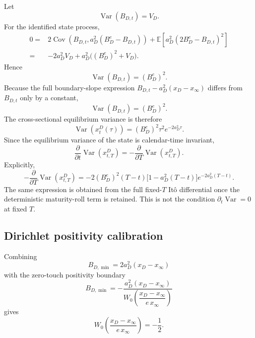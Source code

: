 \documentclass[12pt]{article}
\numberwithin{equation}{subsection}
\newcommand{\E}{\mathbb{E}}
\newcommand{\Var}{\operatorname{Var}}
\newcommand{\Cov}{\operatorname{Cov}}
\begin{document}
Let
\begin{equation}
\Var(B_{D,t})=V_D.
\end{equation}
For the identified state process,
\begin{equation}
\begin{aligned}
0
={}&
2\Cov\!\left(B_{D,t},a_D^2(B_D^e-B_{D,t})\right)
+
\E\!\left[a_D^2(2B_D^e-B_{D,t})^2\right]
\\
={}&
-2a_D^2V_D+a_D^2\bigl((B_D^e)^2+V_D\bigr).
\end{aligned}
\end{equation}
Hence
\begin{equation}
\Var(B_{D,t})=(B_D^e)^2.
\end{equation}
Because the full boundary-slope expression $B_{D,t}-a_D^2(x_D-x_\infty)$ differs from $B_{D,t}$ only by a constant,
\begin{equation}
\Var(B_{D,t})=(B_D^e)^2.
\end{equation}
The cross-sectional equilibrium variance is therefore
\begin{equation}
\Var\!\left(x^D_t(\tau)\right)
=
(B_D^e)^2\tau^2e^{-2a_D^2\tau}.
\end{equation}
Since the equilibrium variance of the state is calendar-time invariant,
\begin{equation}
\frac{\partial}{\partial t}
\Var\!\left(x^D_{t,T}\right)
=
-\frac{\partial}{\partial T}
\Var\!\left(x^D_{t,T}\right).
\end{equation}
Explicitly,
\begin{equation}
-\frac{\partial}{\partial T}
\Var\!\left(x^D_{t,T}\right)
=
-2(B_D^e)^2(T-t)\bigl[1-a_D^2(T-t)\bigr]
e^{-2a_D^2(T-t)}.
\end{equation}
The same expression is obtained from the full fixed-$T$ It\^{o} differential once the deterministic maturity-roll term is retained. This is not the condition $\partial_t\Var=0$ at fixed $T$.

\subsection{Dirichlet positivity calibration}

Combining
\begin{equation}
B_{D,\min}=2a_D^2(x_D-x_\infty)
\end{equation}
with the zero-touch positivity boundary
\begin{equation}
B_{D,\min}
=
-\frac{a_D^2(x_D-x_\infty)}
{W_0\!\left(\dfrac{x_D-x_\infty}{e\,x_\infty}\right)}
\end{equation}
gives
\begin{equation}
W_0\!\left(\frac{x_D-x_\infty}{e\,x_\infty}\right)=-\frac12.
\end{equation}
\end{document}
